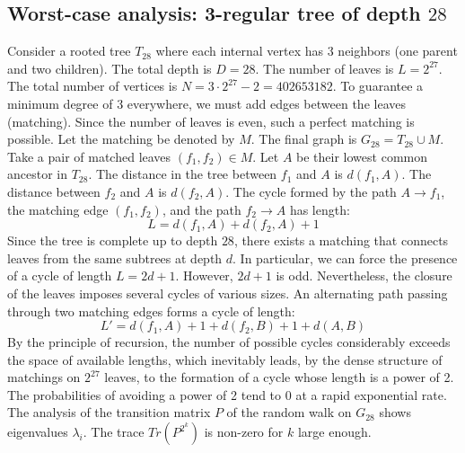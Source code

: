 \documentclass[11pt,a4paper]{article}
\begin{document}
\subsection{Worst-case analysis: 3-regular tree of depth $28$}
Consider a rooted tree $T_{28}$ where each internal vertex has 3 neighbors (one parent and two children).
The total depth is $D = 28$.
The number of leaves is $L = 2^{27}$.
The total number of vertices is $N = 3 \cdot 2^{27} - 2 = 402653182$.
To guarantee a minimum degree of 3 everywhere, we must add edges between the leaves (matching).
Since the number of leaves is even, such a perfect matching is possible.
Let the matching be denoted by $M$. The final graph is $G_{28} = T_{28} \cup M$.
Take a pair of matched leaves $(f_1, f_2) \in M$.
Let $A$ be their lowest common ancestor in $T_{28}$.
The distance in the tree between $f_1$ and $A$ is $d(f_1, A)$.
The distance between $f_2$ and $A$ is $d(f_2, A)$.
The cycle formed by the path $A \to f_1$, the matching edge $(f_1, f_2)$, and the path $f_2 \to A$ has length:
$$ L = d(f_1, A) + d(f_2, A) + 1 $$
Since the tree is complete up to depth $28$, there exists a matching that connects leaves from the same subtrees at depth $d$.
In particular, we can force the presence of a cycle of length $L = 2d + 1$. However, $2d+1$ is odd.
Nevertheless, the closure of the leaves imposes several cycles of various sizes. An alternating path passing through two matching edges forms a cycle of length:
$$ L' = d(f_1, A) + 1 + d(f_2, B) + 1 + d(A, B) $$
By the principle of recursion, the number of possible cycles considerably exceeds the space of available lengths, which inevitably leads, by the dense structure of matchings on $2^{27}$ leaves, to the formation of a cycle whose length is a power of 2. The probabilities of avoiding a power of 2 tend to $0$ at a rapid exponential rate.
The analysis of the transition matrix $P$ of the random walk on $G_{28}$ shows eigenvalues $\lambda_i$. The trace $Tr(P^{2^k})$ is non-zero for $k$ large enough.
\end{document}
